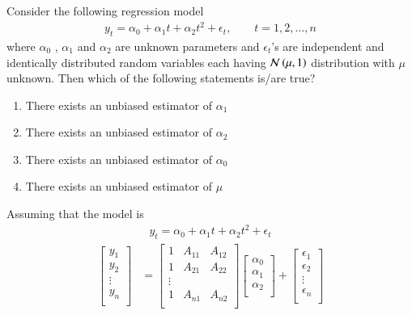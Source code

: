 \documentclass[journal,12pt,onecolumn]{IEEEtran}
\theoremstyle{remark}
\begin{document}



\maketitle



\bigskip

\renewcommand{\thefigure}{\theenumi}
\renewcommand{\thetable}{\theenumi}

Consider the following regression model
\begin{align}
y_t={\alpha}_0+{\alpha}_1t+{\alpha}_2t^2+\epsilon_{t}, \qquad t = 1,2,…,n
\end{align}
where ${\alpha}_0$ , ${\alpha}_1$ and ${\alpha}_2$ are unknown parameters and $\epsilon_{t}$’s are independent and identically distributed random variables each having $\mathcal{N}\left(\mu,1\right)$ distribution with $\mu$ unknown. Then which of the following statements is/are true?
\begin{enumerate}
\item{There exists an unbiased estimator of ${\alpha}_1$}
\item{There exists an unbiased estimator of ${\alpha}_2$}
\item{There exists an unbiased estimator of ${\alpha}_0$}
\item{There exists an unbiased estimator of ${\mu}$}
\end{enumerate}
\fi
\solution
Assuming that the model is 
\begin{align}
y_t={\alpha}_0+{\alpha}_1t+{\alpha}_2t^2+\epsilon_{t}
\end{align}
\begin{align}
\begin{bmatrix} 
	y_1  \\
	y_2 \\
	\vdots\\
	y_n  \\
\end{bmatrix}&=\begin{bmatrix} 
	1&A_{11}&A_{12}  \\
	1&A_{21}&A_{22}\\
	\vdots\\
	1&A_{n1}&A_{n2} \\
\end{bmatrix} \begin{bmatrix} 
	{\alpha}_0  \\
	{\alpha}_1 \\
	{\alpha}_2\\
\end{bmatrix}+\begin{bmatrix} 
	\epsilon_{1}  \\
	\epsilon_{2}  \\\vdots\\\epsilon_{n}  \\
\end{bmatrix}
\end{align}
\end{document}

